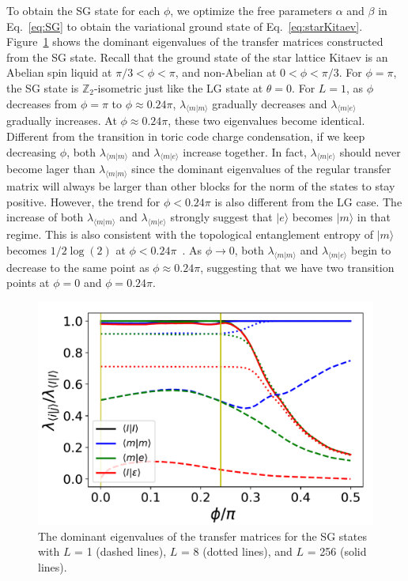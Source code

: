 \documentclass{ntuthesis}
\begin{document}
To obtain the SG state for each $\phi$, we optimize the free parameters $\alpha$ and $\beta$ in Eq.~\eqref{eq:SG} to obtain the variational ground state of Eq.~\eqref{eq:starKitaev}.
%
Figure~\ref{fig:HOTRG_SG} shows the dominant eigenvalues of the transfer matrices constructed from the SG state. 
%
Recall that the ground state of the star lattice  Kitaev is an Abelian spin liquid at $\pi/3<\phi < \pi$, and non-Abelian at $0<\phi<\pi/3$.
% 
For $\phi = \pi$, the SG state is $\mathbb{ Z}_2 $-isometric just like the LG state at $\theta = 0$. 
%
For $L = 1$, as $\phi$ decreases from $\phi = \pi$ to $\phi \approx 0.24\pi$, $\lambda_{\langle m| m\rangle}$ gradually decreases and $\lambda_{\langle m| e\rangle}$ gradually increases. 
%
At $\phi \approx 0.24\pi$, these two eigenvalues become identical. 
%
Different from the transition in toric code charge condensation, if we keep decreasing $\phi$, both $\lambda_{\langle m| m\rangle}$ and $\lambda_{\langle m| e\rangle}$ increase together.
%
In fact, $\lambda_{\langle m| e\rangle}$ should never become lager than $\lambda_{\langle m| m\rangle}$ since the dominant eigenvalues of the regular transfer matrix will always be larger than other blocks for the norm of the states to stay positive. 
%
However, the trend for $\phi < 0.24\pi$ is also different from the LG case. 
%
The increase of both $\lambda_{\langle m| m\rangle}$ and $\lambda_{\langle m| e\rangle}$ strongly suggest that $|e\rangle$ becomes $|m\rangle$ in that regime. 
%
This is also consistent with the topological entanglement  entropy of $|m\rangle$ becomes $1/2\log(2)$ at $\phi < 0.24\pi$~\cite{non-AbelianTO_2020}. 
%
As $\phi \rightarrow 0$, both $\lambda_{\langle m| m\rangle}$ and $\lambda_{\langle m| e\rangle}$ begin to decrease to the same point as $\phi \approx 0.24 \pi$, suggesting that we have two transition points at $\phi = 0$ and $\phi = 0.24 \pi$. 
%


\begin{figure}[t]
 \centering
\includegraphics[width=\linewidth]{HOTRG_SG}
\caption{The dominant eigenvalues of the transfer matrices for the SG states with $L$ = 1 (dashed lines), $L$ = 8 (dotted lines), and $L$ = 256 (solid lines).} 
\label{fig:HOTRG_SG}
\end{figure}
\end{document}

